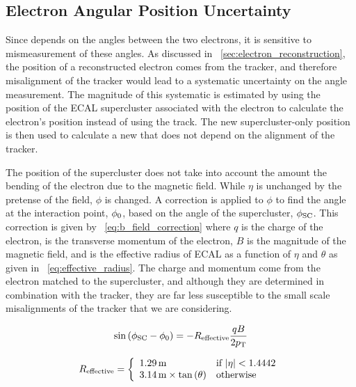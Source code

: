 \subsection{Electron Angular Position Uncertainty}

Since \phistar depends on the angles between the two electrons, it is sensitive
to mismeasurement of these angles. As discussed in
\SEC~\ref{sec:electron_reconstruction}, the position of a reconstructed
electron comes from the tracker, and therefore misalignment of the tracker
would lead to a systematic uncertainty on the angle measurement. The magnitude
of this systematic is estimated by using the position of the ECAL supercluster
associated with the electron to calculate the electron's position instead of
using the track. The new supercluster-only position is then used to calculate a
new \phistarSC that does not depend on the alignment of the tracker.

The position of the supercluster does not take into account the amount the
bending of the electron due to the magnetic field. While $\eta$ is unchanged by
the pretense of the field, $\phi$ is changed. A correction is applied to $\phi$
to find the angle at the interaction point, $\phi_{0}$, based on the angle of
the supercluster, $\phi_{\text{SC}}$. This correction is given by
\EQ~\ref{eq:b_field_correction} where $q$ is the charge of the electron, \pt is
the transverse momentum of the electron, $B$ is the magnitude of the magnetic
field, and \Reffective is the effective radius of ECAL as a function of $\eta$
and $\theta$ as given in \EQ~\ref{eq:effective_radius}. The charge and momentum
come from the electron matched to the supercluster, and although they are
determined in combination with the tracker, they are far less susceptible to
the small scale misalignments of the tracker that we are considering.

\begin{equation}\label{eq:b_field_correction}
    \sin \left( \phi_{\text{SC}} - \phi_{0} \right)
    =
    - R_{\text{effective}} \frac{q B}{2 p_{\mathrm{T}}}
\end{equation}

\begin{equation}\label{eq:effective_radius}
    R_{\text{effective}}
    =
    \left\{
        \begin{array}{ll}
            1.29 \text{\,m} & \text{if } |\eta| < 1.4442 \\
            3.14 \text{\,m} \times \tan \left(\theta\right) & \text{otherwise}
        \end{array}
    \right.
\end{equation}

